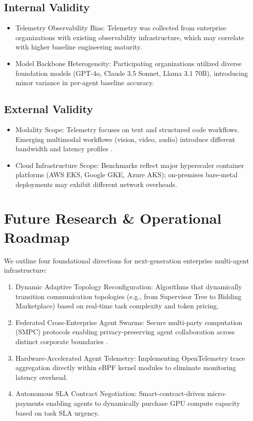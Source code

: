 \documentclass[10pt,twocolumn,letterpaper]{article}
\begin{document}
\subsection{Internal Validity}

\begin{itemize}
  \item Telemetry Observability Bias: Telemetry was collected from enterprise organizations with existing observability infrastructure, which may correlate with higher baseline engineering maturity.
  \item Model Backbone Heterogeneity: Participating organizations utilized diverse foundation models (GPT-4o, Claude 3.5 Sonnet, Llama 3.1 70B), introducing minor variance in per-agent baseline accuracy.
\end{itemize}


\subsection{External Validity}

\begin{itemize}
  \item Modality Scope: Telemetry focuses on text and structured code workflows. Emerging multimodal workflows (vision, video, audio) introduce different bandwidth and latency profiles \cite{arxiv_2308_12898,plos_10_1371_journal_pone_0340964}.
  \item Cloud Infrastructure Scope: Benchmarks reflect major hyperscaler container platforms (AWS EKS, Google GKE, Azure AKS); on-premises bare-metal deployments may exhibit different network overheads.
\end{itemize}




\section{Future Research \& Operational Roadmap}


We outline four foundational directions for next-generation enterprise multi-agent infrastructure:
\begin{enumerate}
  \item Dynamic Adaptive Topology Reconfiguration: Algorithms that dynamically transition communication topologies (e.g., from Supervisor Tree to Bidding Marketplace) based on real-time task complexity and token pricing.
  \item Federated Cross-Enterprise Agent Swarms: Secure multi-party computation (SMPC) protocols enabling privacy-preserving agent collaboration across distinct corporate boundaries \cite{crossref_10_1109_access_2026_3656309}.
  \item Hardware-Accelerated Agent Telemetry: Implementing OpenTelemetry trace aggregation directly within eBPF kernel modules to eliminate monitoring latency overhead.
  \item Autonomous SLA Contract Negotiation: Smart-contract-driven micro-payments enabling agents to dynamically purchase GPU compute capacity based on task SLA urgency.
\end{enumerate}
\end{document}
